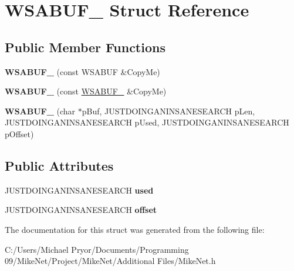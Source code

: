 \hypertarget{struct_w_s_a_b_u_f__2}{
\section{WSABUF\_ Struct Reference}
\label{struct_w_s_a_b_u_f__2}
}
\subsection*{Public Member Functions}
\begin{DoxyCompactItemize}
\item 
\hypertarget{struct_w_s_a_b_u_f__2_a046c34593dd7831977fa052e4361b8a6}{
{\bfseries WSABUF\_} (const WSABUF \&CopyMe)}
\label{struct_w_s_a_b_u_f__2_a046c34593dd7831977fa052e4361b8a6}

\item 
\hypertarget{struct_w_s_a_b_u_f__2_a8a7f42af5faa1dbb73314f8a8b4ec6d5}{
{\bfseries WSABUF\_} (const \hyperlink{struct_w_s_a_b_u_f__2}{WSABUF\_} \&CopyMe)}
\label{struct_w_s_a_b_u_f__2_a8a7f42af5faa1dbb73314f8a8b4ec6d5}

\item 
\hypertarget{struct_w_s_a_b_u_f__2_aecc9d0cc3f08d68b9bdfac50fcdd1cbc}{
{\bfseries WSABUF\_} (char $\ast$pBuf, JUSTDOINGANINSANESEARCH pLen, JUSTDOINGANINSANESEARCH pUsed, JUSTDOINGANINSANESEARCH pOffset)}
\label{struct_w_s_a_b_u_f__2_aecc9d0cc3f08d68b9bdfac50fcdd1cbc}

\end{DoxyCompactItemize}
\subsection*{Public Attributes}
\begin{DoxyCompactItemize}
\item 
\hypertarget{struct_w_s_a_b_u_f__2_ad540a98be372a489d4696c4053fdb8b0}{
JUSTDOINGANINSANESEARCH {\bfseries used}}
\label{struct_w_s_a_b_u_f__2_ad540a98be372a489d4696c4053fdb8b0}

\item 
\hypertarget{struct_w_s_a_b_u_f__2_af1cdcccaab68cad14fc547249ac6875d}{
JUSTDOINGANINSANESEARCH {\bfseries offset}}
\label{struct_w_s_a_b_u_f__2_af1cdcccaab68cad14fc547249ac6875d}

\end{DoxyCompactItemize}


The documentation for this struct was generated from the following file:\begin{DoxyCompactItemize}
\item 
C:/Users/Michael Pryor/Documents/Programming 09/MikeNet/Project/MikeNet/Additional Files/MikeNet.h\end{DoxyCompactItemize}
